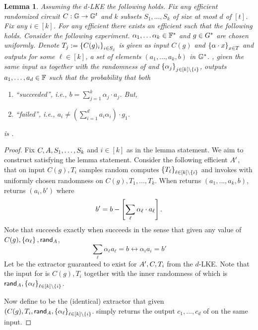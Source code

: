 \documentclass[11pt]{article}
\numberwithin{figure}{section} %
\newtheorem{lemma}[thm]{Lemma}
\newcommand{\set}[1]{\ensuremath{\left\{#1\right\}}\xspace}
\begin{document}
\begin{lemma}\label{lem:batchLKE}
Assuming the $d$-LKE the following holds.
Fix any efficient randomized circuit $C:{\mathbb G} \to {\mathbb G}^{t}$ and $k$ subsets $S_1,\ldots,S_k$ of size at most $d$ of $[t]$.
Fix any $i\in [k]$.
For any efficient \adv there exists an efficient \ext such that the following holds.
Consider the following experiment.
 $\alpha_1,\ldots\alpha_k\in \mathbb F^*$ and $g\in G^*$ are chosen uniformly.
 Denote $T_j\defeq \sett{C(g)_i}{i\in S_j}$
 \adv is given as input $C(g)$ and $\sett{\alpha\cdot x }{x\in T}$
 and outputs for some $\ell \in [k]$, a set of elements  $(a_1,\ldots, a_k,b)$ in ${\mathbb G}^*$.
   \ext, given the same input as \adv together with the randomness of \adv and $\sett{\alpha_j}{j\in [k]\setminus\set{i}}$, outputs  
 $a_1,\ldots,a_d \in \mathbb F$ such that the probability that both
   
 \begin{enumerate}
  \item \adv ``succeeded'', i.e., $b=\sum_{j=1}^k\alpha_j\cdot a_j$. But,
  \item \ext ``failed'', i.e., $a_i \neq (\sum_{i=1}^d a_i \alpha_i)\cdot g_1$.
   \end{enumerate}
is \neg.
\end{lemma}
\begin{proof}
 Fix $C,A, S_1,\ldots,S_k$ and $i\in [k]$ as in the lemma statement. We aim to construct \ext satisfying the lemma statement. Consider the following efficient $A'$, that on input $C(g), T_i$ samples random \sett{\alpha_\ell\in \Fstar}{\ell\in [k]\setminus\set{i}}  computes $\sett{T_\ell}{\ell\in [k]\setminus\set{i}}$ and invokes \adv with
 uniformly chosen randomness \randadv on $C(g),T_1,\ldots,T_k$.
 When \adv returns $(a_1,\ldots,a_k,b)$, \advprime returns $(a_i,b')$ where
 \[b' = b-\left[\sum_\ell \alpha_\ell\cdot a_\ell\right].\]
 Note that \adv succeeds exactly when \advprime succeeds in the sense that
 given any value of $C(g),\set{\alpha_\ell},\randadv$,
 \[\sum_\ell \alpha_\ell a_\ell  = b \leftrightarrow \alpha_i a_i = b'\]
 Let \extprime be the extractor guaranteed to exist for $A',C,T_i$ from the $d$-LKE.
 Note that the input for \extprime is $C(g),T_i$ together with the inner randomness of \advprime which is 
 $\randadv,\sett{\alpha_\ell}{\ell\in [k]\setminus\set{i}}$.
 
 Now define \ext to be the (identical) extractor that given 
 $(C(g),T_i,\randadv,\sett{\alpha_\ell}{\ell\in [k] \setminus\set{i}}$.
 simply returns the output $c_1,\ldots,c_d$ of \extprime on the same input.
\end{proof}
\end{document}
